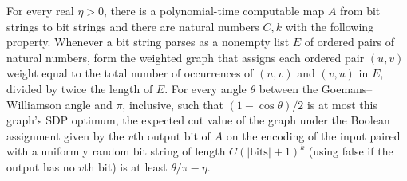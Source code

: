 \begin{theorem}
\label{BooleanAnalysis.GaussianSpace.MaxCut.goemans_williamson_threshold_polyTime}
\leanok
{}
For every real $\eta>0$, there is a polynomial-time computable map $A$ from bit strings
to bit strings and there are natural numbers $C,k$ with the following property. Whenever
a bit string parses as a nonempty list $E$ of ordered pairs of natural numbers, form the
weighted graph that assigns each ordered pair $(u,v)$ weight equal to the total number
of occurrences of $(u,v)$ and $(v,u)$ in $E$, divided by twice the length of $E$. For
every angle $\theta$ between the Goemans–Williamson angle and $\pi$, inclusive, such
that $(1-\cos\theta)/2$ is at most this graph’s SDP optimum, the expected cut value of
the graph under the Boolean assignment given by the $v$th output bit of $A$ on the
encoding of the input paired with a uniformly random bit string of length
$C(\lvert\text{bits}\rvert+1)^k$ (using false if the output has no $v$th bit) is at
least $\theta/\pi-\eta$.
\end{theorem}
